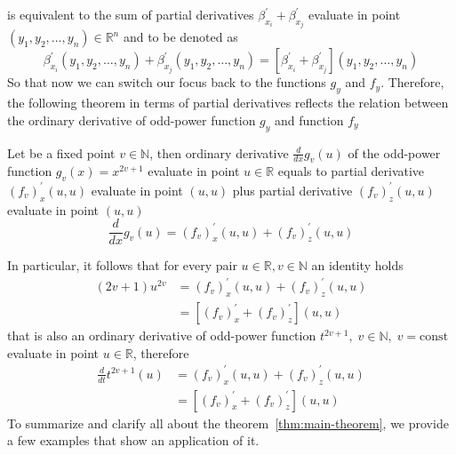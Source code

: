 is equivalent to the sum of partial derivatives $\beta^{'}_{x_i} + \beta^{'}_{x_j}$
evaluate in point $(y_1, y_2, \dots, y_n) \in \mathbb{R}^n$ and to be denoted as
\begin{equation*}
    \beta^{'}_{x_i} (y_1, y_2, \dots, y_n)
    + \beta^{'}_{x_j} (y_1, y_2, \dots, y_n)
    = [\beta^{'}_{x_i} + \beta^{'}_{x_j}] (y_1, y_2, \dots, y_n)
\end{equation*}
So that now we can switch our focus back to the functions $g_{y}$ and $f_{y}$.
Therefore, the following theorem in terms of partial derivatives
reflects the relation between the ordinary derivative of odd-power
function $g_{y}$ and function $f_{y}$
\begin{thm}
    \label{thm:main-theorem}
    Let be a fixed point $v\in \mathbb{N}$, then ordinary derivative $\frac{d}{dx} g_v (u)$ of the odd-power function $g_v(x) = x^{2v + 1}$
    evaluate in point $u\in\mathbb{R}$ equals to partial derivative $(f_{v})^{'}_{x} (u, u)$ evaluate in point $(u, u)$ plus
    partial derivative $(f_{v})^{'}_{z} (u, u)$ evaluate in point $(u, u)$
    \begin{equation}
        \frac{d}{dx} g_v (u) = (f_{v})^{'}_{x} (u, u) + (f_{v})^{'}_{z} (u, u)
        \label{eq:odd-exponential-identity}
    \end{equation}
\end{thm}
In particular, it follows that for every pair $u \in \mathbb{R}, v \in \mathbb{N}$ an identity holds
\begin{align*}
(2v+1)
    u^{2v} &= (f_{v})^{'}_{x} (u, u) + (f_{v})^{'}_{z} (u, u) \\
    &= [(f_{v})^{'}_{x} + (f_{v})^{'}_{z}](u,u)
\end{align*}
that is also an ordinary derivative of odd-power function $t^{2v+1}, \; v\in \mathbb{N}, \; v=\mathrm{const}$
evaluate in point $u\in\mathbb{R}$,
therefore
\begin{align*}
    \frac{d}{dt} t^{2v+1} (u) &= (f_{v})^{'}_{x} (u, u) + (f_{v})^{'}_{z} (u, u) \\
    &= [(f_{v})^{'}_{x} + (f_{v})^{'}_{z}](u,u)
\end{align*}
To summarize and clarify all about the theorem~\ref{thm:main-theorem}, we provide a few examples that show
an application of it.